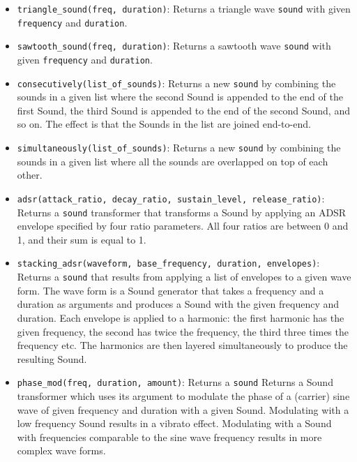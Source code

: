 \begin{itemize}
\item \lstinline{triangle_sound(freq, duration)}: Returns a triangle wave \lstinline{sound} with given \lstinline{frequency} and \lstinline{duration}.

\item \lstinline{sawtooth_sound(freq, duration)}: Returns a sawtooth wave \lstinline{sound} with given \lstinline{frequency} and \lstinline{duration}.

\item \lstinline{consecutively(list_of_sounds)}: Returns a new \lstinline{sound} by combining the sounds in a given list where the second Sound is appended to the end of the first Sound, the third Sound is appended to the end of the second Sound, and so on. The effect is that the Sounds in the list are joined end-to-end.

\item \lstinline{simultaneously(list_of_sounds)}: Returns a new \lstinline{sound} by combining the sounds in a given list where all the sounds are overlapped on top of each other.

\item \lstinline{adsr(attack_ratio, decay_ratio, sustain_level, release_ratio)}: Returns a \lstinline{sound} transformer that transforms a Sound by applying an ADSR envelope specified by four ratio parameters. All four ratios are between 0 and 1, and their sum is equal to 1.

\item \lstinline{stacking_adsr(waveform, base_frequency, duration, envelopes)}: Returns a \lstinline{sound} that results from applying a list of envelopes to a given wave form. The wave form is a Sound generator that takes a frequency and a duration as arguments and produces a Sound with the given frequency and duration. Each envelope is applied to a harmonic: the first harmonic has the given frequency, 
the second has twice the frequency, the third three times the frequency etc. The harmonics are then layered simultaneously to produce the resulting Sound.

\item \lstinline{phase_mod(freq, duration, amount)}: Returns a \lstinline{sound} Returns a Sound transformer which uses its argument to modulate the phase of a (carrier) sine wave of given frequency and duration with a given Sound. 
Modulating with a low frequency Sound results in a vibrato effect. Modulating with a Sound with frequencies comparable to the sine wave frequency results in more complex wave forms.


\end{itemize}
